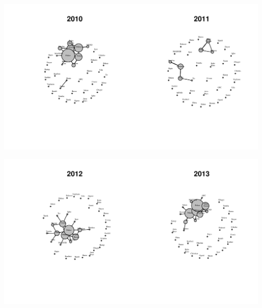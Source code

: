 \documentclass[12pt, letterpaper, notitlepage, onecolumn, twoside, openbib]{article}\usepackage[]{graphicx}\usepackage[]{color}
\newenvironment{knitrout}{}{} %
\begin{document}
\begin{knitrout}
\includegraphics[width=1.1\linewidth]{figure/unnamed-chunk-4-6} 

\includegraphics[width=1.1\linewidth]{figure/unnamed-chunk-4-7} 


\end{knitrout}
\end{document}

